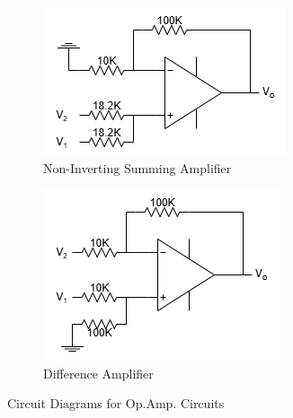 \begin{figure}[H]
            \begin{subfigure}{0.4\textwidth}
                \includegraphics[width=1\linewidth]{Experiment_10/Circuit/Lab10e.drawio.png}
                \caption{Non-Inverting Summing Amplifier}
                \label{cir:NSumAmp}
            \end{subfigure}
            \begin{subfigure}{0.4\textwidth}
                \includegraphics[width=1\linewidth]{Experiment_10/Circuit/Lab10f.drawio.png}
                \caption{Difference Amplifier}
                \label{cir:DiffAmp}
            \end{subfigure}

            \caption{Circuit Diagrams for Op.Amp. Circuits}
        \end{figure}

